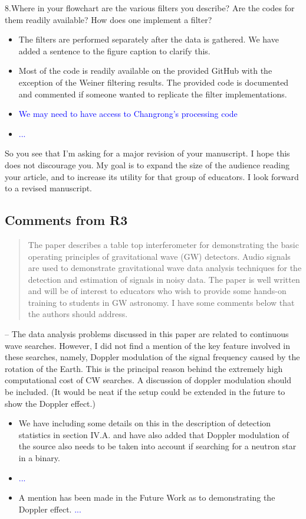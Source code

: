 \documentclass{article}
\newcommand{\todo}{\textcolor{blue}}
\begin{document}
\noindent 8.Where in your flowchart are the various filters you describe?  Are the codes for them readily available?  How does one implement a filter?  
\begin{itemize}
\item The filters are performed separately after the data is gathered. We have added a sentence to the figure caption to clarify this. 
\item Most of the code is readily available on the provided GitHub with the exception of the Weiner filtering results. The provided code is documented and commented if someone wanted to replicate the filter implementations.
\item \todo{We may need to have access to Changrong's processing code}
\item \todo{...}
\end{itemize}


\noindent So you see that I'm asking for a major revision of your manuscript.  I hope this does not discourage you.  My goal is to expand the size of the audience reading your article, and to increase its utility for that group of educators.  I look forward to a revised manuscript.



\subsection*{Comments from R3}

\begin{quote}
The paper describes a table top interferometer for demonstrating the basic operating principles of gravitational wave (GW) detectors. Audio signals are used to demonstrate gravitational wave data analysis techniques for the detection and estimation of signals in noisy data. The paper is well written and will be of interest to educators who wish to provide some hands-on training to students in GW astronomy. I have some comments below that the authors should address.
\end{quote}

\noindent 
-- The data analysis problems discussed in this paper are related to continuous wave searches. However, I did not find a mention of the key feature involved in these searches, namely, Doppler modulation of the signal frequency caused by the rotation of the Earth. This is the principal reason behind the extremely high computational cost of CW searches. A discussion of doppler modulation should be included. (It would be neat if the setup could be extended in the future to show the Doppler effect.)
\begin{itemize}
\item We have including some details on this in the description of detection statistics in section IV.A. and have also added that Doppler modulation of the source also needs to be taken into account if searching for a neutron star in a binary. 
\item \todo{...}
\item A mention has been made in the Future Work as to demonstrating the Doppler effect.
 \todo{...}
\end{itemize}
\end{document}
